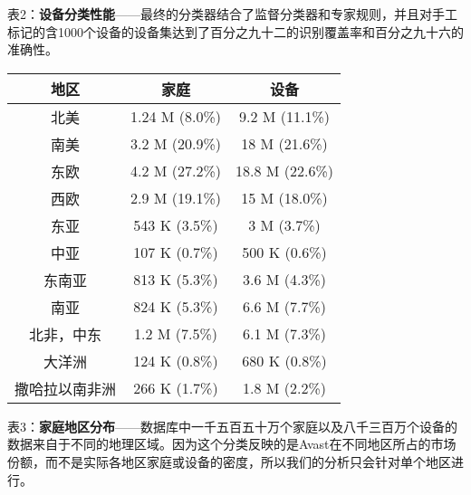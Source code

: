 \documentclass[UTF8]{ctexart}
\begin{document}

	\begin{center}
		表2：\textbf{设备分类性能}——最终的分类器结合了监督分类器和专家规则，并且对手工标记的含1000个设备的设备集达到了百分之九十二的识别覆盖率和百分之九十六的准确性。
	\end{center}
	
	\begin{tabular}{c|c|c}
		\hline
		地区& 家庭& 设备\\
		\hline
		北美& 1.24 M (8.0\%) & 9.2 M (11.1\%)\\
		南美& 3.2 M (20.9\%) & 18 M (21.6\%)\\
		东欧& 4.2 M (27.2\%) & 18.8 M (22.6\%) \\
		西欧& 2.9 M (19.1\%) & 15 M (18.0\%) \\
		东亚& 543 K (3.5\%)  & 3 M (3.7\%) \\
		中亚& 107 K (0.7\%)  & 500 K (0.6\%)\\
		东南亚& 813 K (5.3\%)& 3.6 M (4.3\%) \\
		南亚& 824 K (5.3\%)  & 6.6 M (7.7\%) \\
		北非，中东& 1.2 M (7.5\%) & 6.1 M (7.3\%) \\
		大洋洲& 124 K (0.8\%)&680 K (0.8\%)\\
		撒哈拉以南非洲& 266 K (1.7\%) & 1.8 M (2.2\%)\\
		\hline
	\end{tabular}

	\begin{center}
		表3：\textbf{家庭地区分布}——数据库中一千五百五十万个家庭以及八千三百万个设备的数据来自于不同的地理区域。因为这个分类反映的是Avast在不同地区所占的市场份额，而不是实际各地区家庭或设备的密度，所以我们的分析只会针对单个地区进行。
	\end{center}
\end{document}
